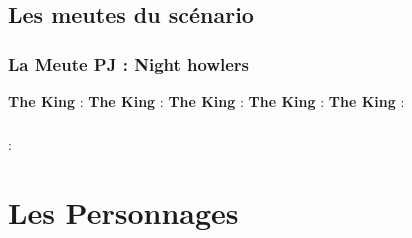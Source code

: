 \documentclass[oneside,12pt]{book}
\newcommand{\King}{\textbf{The King} }
\begin{document}
\begin{flushleft}
  
\clearpage
\section{Les meutes du scénario}
\subsection{La Meute PJ : Night howlers}
\King :
\King : 
\King : 
\King : 
\King : 

\subsection{}


\subsection{}
\textbf{} : \\




\chapter{Les Personnages}
\clearpage

\end{flushleft}
\end{document}
